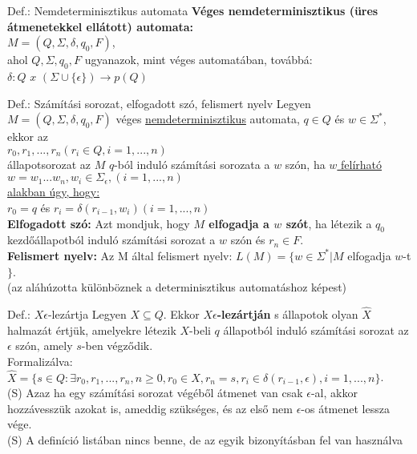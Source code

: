 \documentclass{beamer}
\begin{document}
\begin{frame}
\begin{block}{Def.: Nemdeterminisztikus automata}
\textbf{Véges nemdeterminisztikus (üres átmenetekkel ellátott) automata:}\\
\medskip
$M = (Q, {\Sigma}, {\delta}, q_0, F)$,\\
\medskip
ahol $Q, {\Sigma}, q_0, F$ ugyanazok, mint véges automatában, továbbá:\\
\medskip
$\delta : Q$ $x$ $({\Sigma} \cup \{{\epsilon}\}) \rightarrow p(Q)$
\end{block}

\begin{block}{Def.: Számítási sorozat, elfogadott szó, felismert nyelv}
Legyen $M = (Q, {\Sigma}, {\delta}, q_0, F)$ véges \underline{nemdeterminisztikus} automata, $q \in Q$ és \underline{$w \in {\Sigma}^*$}, ekkor az\\
\medskip
$r_0, r_1, ..., r_n (r_i \in Q, i = 1, ..., n)$\\
\medskip
állapotsorozat az $M$ $q$-ból induló számítási sorozata a $w$ szón, ha \underline{$w$ felírható}\\
\medskip
\underline{$w = w_1 ... w_n, w_i \in {\Sigma}_{\epsilon}, (i = 1, ..., n)$}\\
\medskip
\underline{alakban úgy, hogy:}\\
\medskip
$r_0 = q$ és $r_i = {\delta}(r_{i - 1}, w_i)(i = 1, ..., n)$\\
\bigskip
\textbf{Elfogadott szó:} Azt mondjuk, hogy \textbf{$M$ elfogadja a $w$ szót}, ha létezik a $q_0$ kezdőállapotból induló számítási sorozat a $w$ szón és $r_n \in F$.\\
\bigskip
\textbf{Felismert nyelv:} Az M által felismert nyelv: $L(M) = \{w \in {\Sigma}^* | M$ elfogadja $w$-t$\}$.\\
\bigskip
(az aláhúzotta különböznek a determinisztikus automatáshoz képest)
\end{block}

\begin{block}{Def.: $X \epsilon$-lezártja}
Legyen $X \subseteq Q$. Ekkor \textbf{$X \epsilon$-lezártján} s állapotok olyan $\widehat{X}$ halmazát értjük, amelyekre létezik $X$-beli $q$ állapotból induló számítási sorozat az $\epsilon$ szón, amely $s$-ben végződik.\\
Formalizálva:\\
$\widehat{X} = \{s \in Q : {\exists}r_0,r_1,...,r_n, n \geq 0, r_0 \in X, r_n = s, r_i \in {\delta}(r_{i - 1}, {\epsilon}), i = 1, ..., n\}$.\\
{\tiny (S) Azaz ha egy számítási sorozat végéből átmenet van csak $\epsilon$-al, akkor hozzávesszük azokat is, ameddig szükséges, és az első nem $\epsilon$-os átmenet lessza vége.}\\
{\tiny (S) A definíció listában nincs benne, de az egyik bizonyításban fel van használva}
\end{block}
\end{frame}
\end{document}
